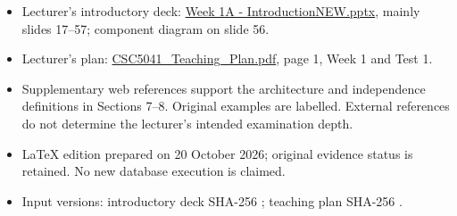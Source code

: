 \begin{itemize}
\tightlist
\item
  Lecturer's introductory deck: \href{../../../slides/Week\%201A\%20-\%20IntroductionNEW.pptx}{Week 1A - IntroductionNEW.pptx}, mainly slides 17--57; component diagram on slide 56.
\item
  Lecturer's plan: \href{../../../slides/CSC5041_Teaching_Plan.pdf}{CSC5041\_Teaching\_Plan.pdf}, page 1, Week 1 and Test 1.
\item
  Supplementary web references support the architecture and independence definitions in Sections 7--8. Original examples are labelled. External references do not determine the lecturer's intended examination depth.
\item
  LaTeX edition prepared on 20 October 2026; original evidence status is retained. No new database execution is claimed.
\item
  Input versions: introductory deck SHA-256 \texttt{}; teaching plan SHA-256 \texttt{}.
\end{itemize}
